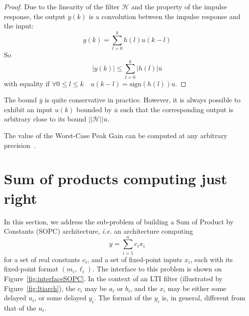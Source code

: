 \documentclass[twocolumn]{IEEEtran}
\newcommand{\bound}[1]{\overline{#1}}
\newcommand{\wcpg}[1]{||#1||}
\begin{document}
\begin{proof}
	Due to the linearity of the filter $\mathcal{H}$ and the property of the impulse response, the output $y(k)$ is a convolution between the impulse response and the input:
	\begin{equation}\label{eq:bound_y}
 		y(k) = \sum_{l=0}^{k} h(l) u(k-l)
	\end{equation}
	So
	\begin{equation}
 		|y(k)| \leq \sum_{l=0}^{k} |h(l)| \bound{u}
	\end{equation}
	with equality if $\forall 0 \leq l \leq k \quad u(k-l)=\text{sign}(h(l))\bound{u} $.
\end{proof}


The bound $\bound{y}$ is quite conservative in practice. 
However, it is always possible to exhibit an input $u(k)$ bounded by $\bound{u}$ such that the corresponding output is arbitrary close to its bound $\wcpg{\mathcal{H}} \bound{u}$. 

The value of the Worst-Case Peak Gain  can be computed at any arbitrary precision~\cite{Volk15a}.











\section{Sum of products computing just right\label{sec:SoPC}}

In this section, we address the sub-problem of building a Sum of Product by Constants (SOPC) architecture, \emph{i.e.} an architecture computing 
\begin{equation}
  \label{eq:sopc0}
  y=\sum_{i=1}^{n}c_ix_i
\end{equation}
for a set of real constants $c_i$, and a set of fixed-point inputs $x_i$, each with its fixed-point format $(m_i,\ell_i)$.
The interface to this problem is shown on Figure~\ref{fig:interfaceSOPC}.
In the context of an LTI filter (illustrated by Figure~\ref{fig:ltiarch}), the $c_i$ may be $a_i$ or $b_i$, and the $x_i$ may be either some delayed $u_i$, or some delayed $y_i$.
The format of the $y_i$ is, in general, different from that of the $u_i$. 
\end{document}
